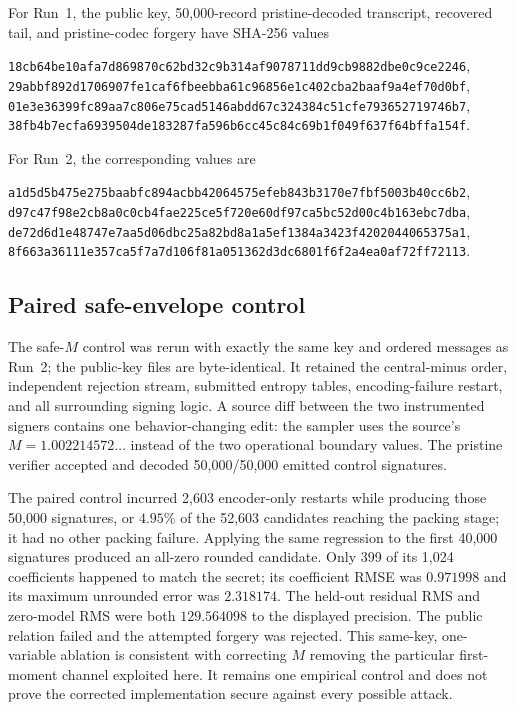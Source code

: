 \documentclass[11pt,a4paper]{article}
\begin{document}
For Run~1, the public key, 50,000-record pristine-decoded transcript,
recovered tail, and pristine-codec forgery have SHA-256 values
\begin{center}
\small
\texttt{18cb64be10afa7d869870c62bd32c9b314af9078711dd9cb9882dbe0c9ce2246},\\
\texttt{29abbf892d1706907fe1caf6fbeebba61c96856e1c402cba2baaf9a4ef70d0bf},\\
\texttt{01e3e36399fc89aa7c806e75cad5146abdd67c324384c51cfe793652719746b7},\\
\texttt{38fb4b7ecfa6939504de183287fa596b6cc45c84c69b1f049f637f64bffa154f}.
\end{center}
For Run~2, the corresponding values are
\begin{center}
\small
\texttt{a1d5d5b475e275baabfc894acbb42064575efeb843b3170e7fbf5003b40cc6b2},\\
\texttt{d97c47f98e2cb8a0c0cb4fae225ce5f720e60df97ca5bc52d00c4b163ebc7dba},\\
\texttt{de72d6d1e48747e7aa5d06dbc25a82bd8a1a5ef1384a3423f4202044065375a1},\\
\texttt{8f663a36111e357ca5f7a7d106f81a051362d3dc6801f6f2a4ea0af72ff72113}.
\end{center}

\subsection{Paired safe-envelope control}

The safe-$M$ control was rerun with exactly the same key and ordered messages
as Run~2; the public-key files are byte-identical.  It retained the
central-minus order, independent rejection stream, submitted entropy tables,
encoding-failure restart, and all surrounding signing logic.  A source diff
between the two instrumented signers contains one behavior-changing edit:
the sampler uses the source's $M=1.002214572\ldots$ instead of the two
operational boundary values.  The pristine verifier accepted and decoded
50,000/50,000 emitted control signatures.

The paired control incurred 2,603 encoder-only restarts while producing those
50,000 signatures, or $4.95\%$ of the 52,603 candidates reaching the packing
stage; it had no other packing failure.  Applying the same regression to the
first 40,000 signatures produced an all-zero rounded candidate.  Only 399 of
its 1,024 coefficients happened to match the secret; its coefficient RMSE was
$0.971998$ and its maximum unrounded error was $2.318174$.  The held-out
residual RMS and zero-model RMS were both $129.564098$ to the displayed
precision.  The public relation failed and the attempted forgery was rejected.
This same-key, one-variable ablation is consistent with correcting $M$
removing the particular first-moment channel exploited here.  It remains one
empirical control and does not prove the corrected implementation secure
against every possible attack.
\end{document}
